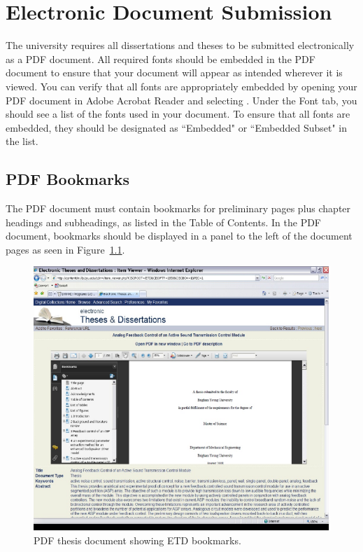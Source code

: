 \chapter{Electronic Document Submission}
\label{ap:elect_doc}

The university requires all dissertations and theses to be submitted electronically as 
a PDF document. All required fonts should be embedded in the PDF document to ensure that
your document will appear as intended wherever it is viewed. You can verify that all fonts
are appropriately embedded by opening your PDF document in Adobe Acrobat Reader and selecting
{}. Under the Font tab, you should see a list of the fonts used in your document.
To ensure that all fonts are embedded, they should be designated as ``Embedded" or ``Embedded 
Subset" in the list.

\section{PDF Bookmarks}
The PDF document must contain bookmarks for preliminary pages plus chapter headings and 
subheadings, as listed in the Table of Contents. In the PDF document, bookmarks should be 
displayed in a panel to the left of the document pages as seen in Figure~\ref{fig:PDF_doc}. 

\begin{figure}[htbp]
	\centering
	\includegraphics[width=4.5in]{figures/PDF_doc}
	\caption{PDF thesis document showing ETD bookmarks.}
	\label{fig:PDF_doc}
\end{figure}

